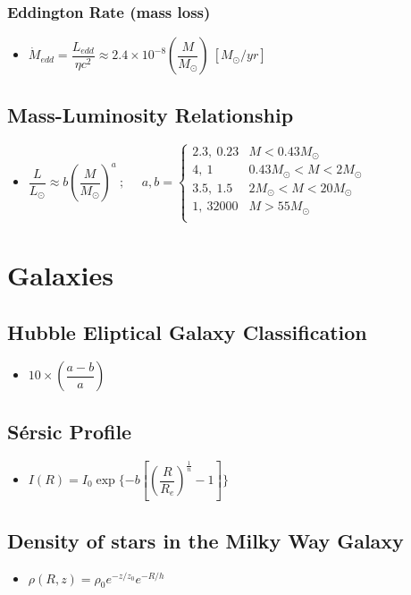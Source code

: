 \documentclass[]{report}
\newcommand \tab[1][1cm]{\hspace*{#1}}
\newcommand{\itemt}{\item \tab}
\begin{document}
\subsubsection{Eddington Rate (mass loss)}
\begin{itemize}
\itemt \( \dot{M}_{edd} = \dfrac{L_{edd}}{\eta c^2} \approx 2.4 \times 10^{-8} (\dfrac{M}{M_\odot})\ [M_\odot / yr]\)
\end{itemize}

\subsection{Mass-Luminosity Relationship}
\begin{itemize}
\item \( \dfrac{L}{L_\odot} \approx b(\dfrac{M}{M_\odot})^a\ ;\ \ \ \ \ \ a, b = \begin{cases} 
      2.3,\ 0.23	& M<0.43M_\odot \\
      4,\ 1			& 0.43M_\odot < M < 2M_\odot \\
      3.5,\ 1.5 	& 2M_\odot < M < 20M_\odot \\
      1,\ 32000 	& M > 55M_\odot \\
   \end{cases}
\)
\end{itemize}


	\section{Galaxies}

\subsection{Hubble Eliptical Galaxy Classification}			
\begin{itemize}
\itemt \( 10 \times (\dfrac{a-b}{a}) \)
\end{itemize}

\subsection{S\'ersic Profile}
\begin{itemize}
\item \( I(R) = I_0 \exp\{-b[(\dfrac{R}{R_e})^\frac{1}{n}-1]\} \)
\end{itemize}

\subsection{Density of stars in the Milky Way Galaxy}
\begin{itemize}
\item \( \rho(R,z) = \rho_0 e^{-z/z_0} e^{-R/h} \)
\end{itemize}
\end{document}
